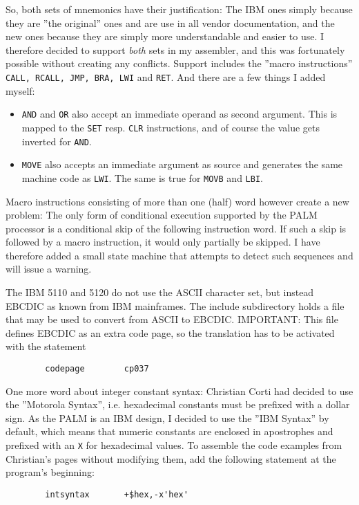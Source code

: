 \documentclass[12pt,twoside]{report}
\begin{document}
So, both sets of mnemonics have their justification: The IBM ones
simply because they are ''the original'' ones and are use in all vendor
documentation, and the new ones because they are simply more
understandable and easier to use.  I therefore decided to support {\em
both} sets in my assembler, and this was fortunately possible without
creating any conflicts.  Support includes the ''macro instructions''
{\tt CALL, RCALL, JMP, BRA, LWI} and {\tt RET}.  And there are a few
things I added myself:
\begin{itemize}
\item{{\tt AND} and {\tt OR} also accept an immediate operand as second 
      argument. This is mapped to the {\tt SET} resp. {\tt CLR} instructions,
      and of course the value gets inverted for {\tt AND}.}
\item{{\tt MOVE} also accepts an immediate argument as source and generates
      the same machine code as {\tt LWI}.  The same is true for {\tt MOVB}
      and {\tt LBI}.}
\end{itemize}
Macro instructions consisting of more than one (half) word however
create a new problem: The only form of conditional execution supported
by the PALM processor is a conditional skip of the following
instruction word.  If such a skip is followed by a macro instruction,
it would only partially be skipped.  I have therefore added a small
state machine that attempts to detect such sequences and will issue a
warning.

The IBM 5110 and 5120 do not use the ASCII character set, but instead
EBCDIC as known from IBM mainframes.  The include subdirectory holds
a file that may be used to convert from ASCII to EBCDIC. IMPORTANT:
This file defines EBCDIC as an extra code page, so the translation
has to be activated with the statement
\begin{verbatim}
        codepage        cp037
\end{verbatim}

One more word about integer constant syntax: Christian Corti had
decided to use the ''Motorola Syntax'', i.e.  hexadecimal constants
must be prefixed with a dollar sign.  As the PALM is an IBM design, I
decided to use the ''IBM Syntax'' by default, which means that numeric
constants are enclosed in apostrophes and prefixed with an {\tt X} for
hexadecimal values.  To assemble the code examples from Christian's
pages without modifying them, add the following statement at the
program's beginning:
\begin{verbatim}
        intsyntax       +$hex,-x'hex'
\end{verbatim}
\end{document}
